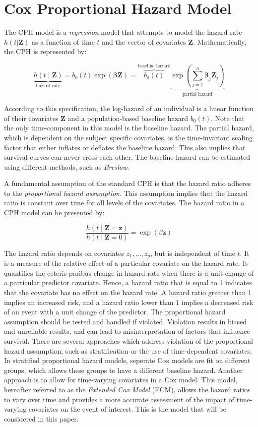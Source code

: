 \medskip
\section{Cox Proportional Hazard Model}
\label{section:data:CPH}
The CPH model is a \textit{regression} model that attempts to model the hazard rate $h(t|\mathbf{Z})$ as a function of time $t$ and the vector of covariates $\mathbf{Z}$. Mathematically, the CPH is represented by: 

$$
\underbrace{h(t \mid \mathbf{Z})}_{\text{hazard rate}} =  b_0(t) \exp(\mathbf{\beta}\mathbf{Z})  = \overbrace{b_0(t)}^{\text{baseline hazard}} \underbrace{\exp \left(\sum_{j=1}^n \mathbf{\beta}_j\mathbf{Z}_j\right)}_{\text{partial hazard}}
$$

According to this specification, the log-hazard of an individual is a linear function of their covariates $\textbf{Z}$ and a population-based baseline hazard $b_{0}(t)$. Note that the only time-component in this model is the baseline hazard. The partial hazard, which is dependent on the subject specific covariates, is the time-invariant scaling factor that either inflates or deflates the baseline hazard. This also implies that survival curves can never cross each other. The baseline hazard can be estimated using different methods, such as \textit{Breslow}. %

A fundamental assumption of the standard CPH is that the hazard ratio adheres to the \textit{proportional hazard assumption}. This assumption implies that the hazard ratio is constant over time for all levels of the covariates. The hazard ratio in a CPH model can be presented by: 

$$\frac{h(t \mid \textbf{Z} = \textbf{z})}{h(t \mid \textbf{Z} = 0)} = \exp(\beta \textbf{z})$$

The hazard ratio depends on covariates $z_1, ..., z_p$, but is independent of time $t$. It is a measure of the relative effect of a particular covariate on the hazard rate. It quantifies the ceteris paribus change in hazard rate when there is a unit change of a particular predictor covariate. Hence, a hazard ratio that is equal to 1 indicates that the covariate has no effect on the hazard rate. A hazard ratio greater than 1 implies an increased risk, and a hazard ratio lower than 1 implies a decreased risk of an event with a unit change of the predictor. The proportional hazard assumption should be tested and handled if violated. %
Violation results in biased and unreliable results, and can lead to misinterpretation of factors that influence survival. There are several approaches which address violation of the proportional hazard assumption, such as stratification or the use of time-dependent covariates. In stratified proportional hazard models, seperate Cox models are fit on different groups, which allows these groups to have a different baseline hazard. Another approach is to allow for time-varying covariates in a Cox model. This model, hereafter referred to as the \textit{Extended Cox Model} (ECM), allows the hazard ratios to vary over time and provides a more accurate assessment of the impact of time-varying covariates on the event of interest. This is the model that will be considered in this paper. 

